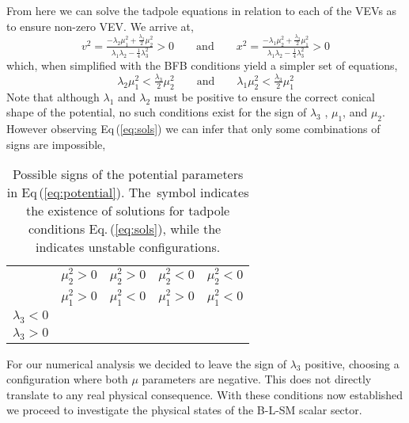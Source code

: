 % 
From here we can solve the tadpole equations in relation to each of the VEVs as to ensure non-zero VEV. We arrive at,
%
\begin{equation}
	v^2 = \tfrac{-\lambda_2 \mu_1^2 + \tfrac{\lambda_3}{2}\mu_2^2}{\lambda_1 \lambda_2 - \tfrac{1}{4}\lambda_3^2} > 0
	\qquad
	\text{and}
	\qquad
	x^2 = \tfrac{-\lambda_1 \mu_2^2 + \tfrac{\lambda_3}{2}\mu_1^2}{\lambda_1 \lambda_2 - \tfrac{1}{4}\lambda_3^2} > 0 
	\label{eq:extremum}
\end{equation}
%
which, when simplified with the BFB conditions yield a simpler set of equations,
%
\begin{equation}
\lambda_2 \mu_1^2 < \tfrac{\lambda_3}{2} \mu_2^2 
\qquad
\text{and}
\qquad
\lambda_1 \mu_2^2 < \tfrac{\lambda_3}{2} \mu_1^2
\label{eq:sols}
\end{equation}
%
Note that although $\lambda_1$ and $\lambda_2$ must be positive to ensure the correct conical shape of the potential, no such conditions exist for the sign of $\lambda_3$ , $\mu_1$, and $\mu_2$. However observing Eq\,(\ref{eq:sols}) we can infer that only some combinations of signs are impossible, 
%
\begin{table}[H]
	\begin{center}
		\begin{tabular}{ccccc}
			& $\mu_2^2 > 0$ & $\mu_2^2 > 0$ & $\mu_2^2 < 0$ & $\mu_2^2 < 0$  	\\
			& $\mu_1^2 > 0$ & $\mu_1^2 < 0$ & $\mu_1^2 > 0$ & $\mu_1^2 < 0$  	\\        
			\hline  
			$\lambda_3 < 0 $     			    							& \xmark		& \checkmark	&	\checkmark & \checkmark	\\
			$\lambda_3 > 0$     			    							& \xmark		& \xmark	&	\xmark &  \checkmark \\
			\hline
		\end{tabular} 
		\caption{Possible signs of the potential parameters in Eq\,(\ref{eq:potential}). 
The \checkmark\,symbol indicates the existence of solutions for tadpole conditions Eq.\,(\eqref{eq:sols}), while the \xmark\,indicates unstable configurations.}
		\label{tab:signs}  
	\end{center}
\end{table} 
%
For our numerical analysis we decided to leave the sign of $\lambda_3$ positive, choosing a configuration where both $\mu$ parameters are negative. 
%
This does not directly translate to any real physical consequence.  
%
With these conditions now established we proceed to investigate the physical states of the B-L-SM scalar sector. 
